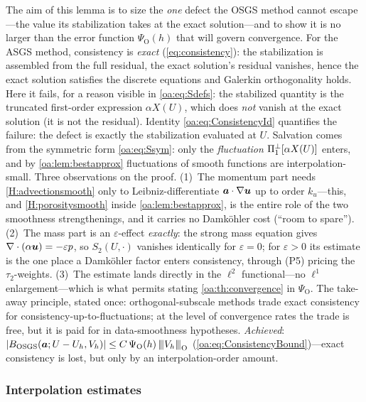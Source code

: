 \begin{pedagogy}
The aim of this lemma is to size the \emph{one} defect the OSGS method cannot
escape---the value its stabilization takes at the exact solution---and to show it
is no larger than the error function $\Psi_{\mathrm O}(h)$ that will govern
convergence. For the ASGS method, consistency is \emph{exact} (\cref{eq:consistency}): the
stabilization is assembled from the full residual, the exact solution's
residual vanishes, hence the exact solution satisfies the discrete equations
and Galerkin orthogonality holds. Here it fails, for a reason visible in
\cref{oa:eq:Sdefs}: the stabilized quantity is the truncated first-order
expression $\alpha X(U)$, which does \emph{not} vanish at the exact solution
(it is not the residual). Identity \cref{oa:eq:ConsistencyId} quantifies the
failure: the defect is exactly the stabilization evaluated at $U$. Salvation
comes from the symmetric form \cref{oa:eq:Ssym}: only the \emph{fluctuation}
$\Pi_{1}^{\perp}[\alpha X(U)]$ enters, and by \cref{oa:lem:bestapprox} fluctuations of
smooth functions are interpolation-small. Three observations on the proof.
(1)~The momentum part needs \cref{H:advectionsmooth} only to
Leibniz-differentiate $\boldsymbol{a}\cdot\nabla\boldsymbol{u}$ up to order $k_u$---this, and
\cref{H:porositysmooth} inside \cref{oa:lem:bestapprox}, is the entire role of
the two smoothness strengthenings, and it carries no Damk\"ohler cost (``room
to spare''). (2)~The mass part is an $\varepsilon$-effect \emph{exactly}: the
strong mass equation gives $\nabla\cdot(\alpha\boldsymbol{u}) = -\varepsilon p$, so
$S_2(U,\cdot)$ vanishes identically for $\varepsilon = 0$; for
$\varepsilon > 0$ its estimate is the one place a Damk\"ohler factor enters
consistency, through (P5) pricing the $\tau_2$-weights. (3)~The estimate lands
directly in the $\ell^2$ functional---no $\ell^1$ enlargement---which is what
permits stating \cref{oa:th:convergence} in $\Psi_{\mathrm O}$. The take-away
principle, stated once: orthogonal-subscale methods trade exact consistency
for consistency-up-to-fluctuations; at the level of convergence rates the
trade is free, but it is paid for in data-smoothness hypotheses.
\emph{Achieved}: $|B_{\mathrm{OSGS}}(\boldsymbol{a};U-U_h,V_h)| \le C\,\Psi_{\mathrm O}(h)\,{\lvert\kern-0.25ex\lvert\kern-0.25ex\lvert V_h \rvert\kern-0.25ex\rvert\kern-0.25ex\rvert}_{\mathrm O}$
(\cref{oa:eq:ConsistencyBound})---exact consistency is lost, but only by an
interpolation-order amount.
\end{pedagogy}

\subsubsection{Interpolation estimates}

